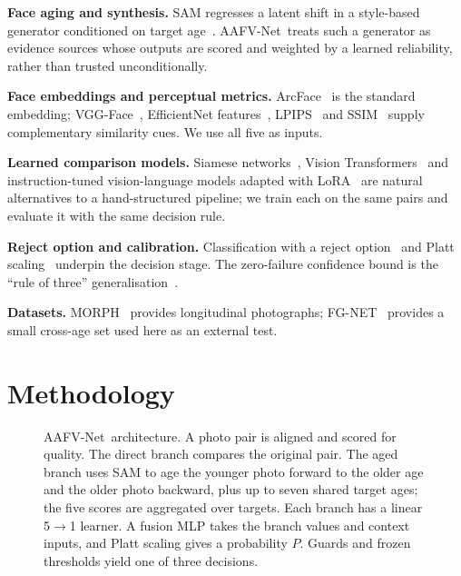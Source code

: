 \documentclass[10pt, a4paper, twocolumn]{article}
\newcommand{\sys}{AAFV-Net}
\begin{document}
\textbf{Face aging and synthesis.} SAM regresses a latent shift in a style-based generator conditioned on target age~\cite{alaluf2021sam}. \sys\ treats such a generator as evidence sources whose outputs are scored and weighted by a learned reliability, rather than trusted unconditionally.

\textbf{Face embeddings and perceptual metrics.} ArcFace~\cite{deng2019arcface} is the standard embedding; VGG-Face~\cite{parkhi2015vgg}, EfficientNet features~\cite{tan2019efficientnet}, LPIPS~\cite{zhang2018lpips} and SSIM~\cite{wang2004ssim} supply complementary similarity cues. We use all five as inputs.

\textbf{Learned comparison models.} Siamese networks~\cite{chopra2005siamese,koch2015siamese}, Vision Transformers~\cite{dosovitskiy2021vit} and instruction-tuned vision-language models adapted with LoRA~\cite{hu2022lora,wang2024qwen2vl} are natural alternatives to a hand-structured pipeline; we train each on the same pairs and evaluate it with the same decision rule.

\textbf{Reject option and calibration.} Classification with a reject option~\cite{chow1970reject} and Platt scaling~\cite{platt1999} underpin the decision stage. The zero-failure confidence bound is the ``rule of three'' generalisation~\cite{hanley1983rule3}.

\textbf{Datasets.} MORPH~\cite{ricanek2006morph} provides longitudinal photographs; FG-NET~\cite{lanitis2002fgnet} provides a small cross-age set used here as an external test.

\section{Methodology}
\begin{figure}[t]
\centering
{}
\caption{\sys\ architecture. A photo pair is aligned and scored for quality. The direct branch compares the original pair. The aged branch uses SAM to age the younger photo forward to the older age and the older photo backward, plus up to seven shared target ages; the five scores are aggregated over targets. Each branch has a linear 5$\to$1 learner. A fusion MLP takes the branch values and context inputs, and Platt scaling gives a probability $P$. Guards and frozen thresholds yield one of three decisions.}
\label{fig:arch}
\end{figure}
\end{document}

